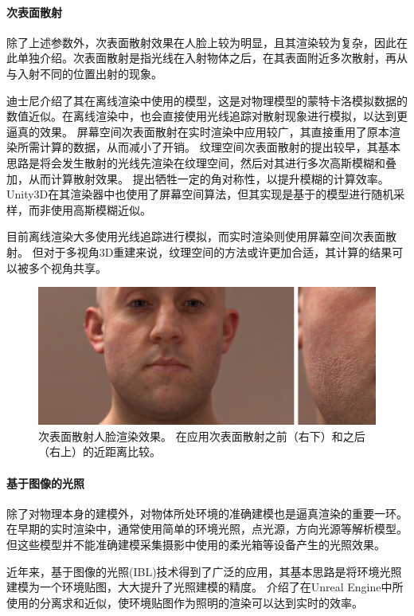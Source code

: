 \paragraph{次表面散射}
除了上述参数外，次表面散射效果在人脸上较为明显，且其渲染较为复杂，因此在此单独介绍。次表面散射是指光线在入射物体之后，在其表面附近多次散射，再从与入射不同的位置出射的现象。

迪士尼介绍了其在离线渲染中使用的模型\citep{SSS_disney}，这是对物理模型的蒙特卡洛模拟数据的数值近似。在离线渲染中，也会直接使用光线追踪对散射现象进行模拟，以达到更逼真的效果。
屏幕空间次表面散射\citep{SSSSS}在实时渲染中应用较广，其直接重用了原本渲染所需计算的数据，从而减小了开销。
纹理空间次表面散射\citep{texSSS}的提出较早，其基本思路是将会发生散射的光线先渲染在纹理空间，然后对其进行多次高斯模糊和叠加，从而计算散射效果。
\citet{SpSSS}提出牺牲一定的角对称性，以提升模糊的计算效率。
Unity3D在其渲染器中也使用了屏幕空间算法\citep{SSS_u3d}，但其实现是基于\citet{SSS_disney}的模型进行随机采样，而非使用高斯模糊近似。

目前离线渲染大多使用光线追踪进行模拟，而实时渲染则使用屏幕空间次表面散射。
但对于多视角3D重建来说，纹理空间的方法或许更加合适，其计算的结果可以被多个视角共享。

\begin{figure}
    \centering
    \includegraphics[width=\linewidth]{figures/sss}
    \caption[次表面散射人脸渲染效果]
    {次表面散射人脸渲染效果\citep{SpSSS}。
    在应用次表面散射之前（右下）和之后（右上）的近距离比较。}
\end{figure}

\paragraph{基于图像的光照}

除了对物理本身的建模外，对物体所处环境的准确建模也是逼真渲染的重要一环。
在早期的实时渲染中，通常使用简单的环境光照，点光源，方向光源等解析模型。
但这些模型并不能准确建模采集摄影中使用的柔光箱等设备产生的光照效果。

近年来，基于图像的光照(IBL)技术得到了广泛的应用，其基本思路是将环境光照建模为一个环境贴图，大大提升了光照建模的精度。
\citet{unreal_ssa}介绍了在Unreal Engine中所使用的分离求和近似，使环境贴图作为照明的渲染可以达到实时的效率。
